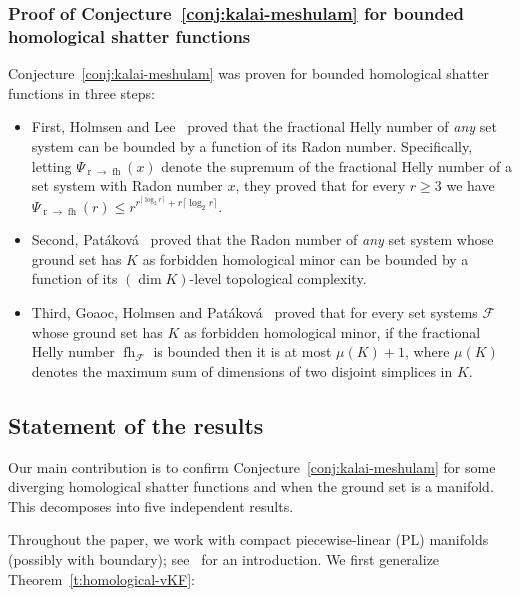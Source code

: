 \documentclass[a4paper,UKenglish,thm-restate]{article}
\newcommand{\F}{\mathcal{F}}
\DeclareMathOperator{\rad}{r}
\DeclareMathOperator{\fh}{fh}
\begin{document}
\subsubsection{Proof of Conjecture~\ref{conj:kalai-meshulam} for bounded homological shatter functions}

Conjecture~\ref{conj:kalai-meshulam} was proven for bounded homological shatter functions in three steps: 

\begin{itemize}
\item First, Holmsen and Lee~\cite[Theorem~1.1]{Holmsen2021} proved that the fractional Helly number of \emph{any} set system can be bounded by a function of its Radon number. Specifically, letting $\Psi_{\rad \to \fh}(x)$ denote the supremum of the fractional Helly number of a set system with Radon number $x$, they proved  that for every $r \ge 3$ we have $\Psi_{\rad \to \fh}(r) \le r^{r^{\lceil \log_2r \rceil}+r\lceil \log_2r \rceil}$.\medskip

\item Second, Patáková~\cite[Theorem~2.1]{patakova2022bounding} proved that the Radon number of \emph{any} set system whose ground set has $K$ as forbidden homological minor can be bounded by a function of its $(\dim K)$-level topological complexity.\medskip

\item Third, Goaoc, Holmsen and Patáková~\cite[Theorem~1.2]{steppingUp} proved that for every set systems $\F$ whose ground set has $K$ as forbidden homological minor, if the fractional Helly number $\fh_\F$ is bounded then it is at most $\mu(K)+1$, where $\mu(K)$ denotes the maximum sum of dimensions of two disjoint simplices in $K$.
\end{itemize}



\subsection{Statement of the results}\label{s:results}

Our main contribution is to confirm Conjecture~\ref{conj:kalai-meshulam} for some diverging homological shatter functions and when the ground set is a manifold. This decomposes into five independent results.

\medskip

Throughout the paper, we work with compact piecewise-linear (PL) manifolds (possibly with  boundary); see~\cite[$\mathsection 1$]{Rourke1972IntroductionTP} for an introduction. We first generalize Theorem~\ref{t:homological-vKF}:
\end{document}
